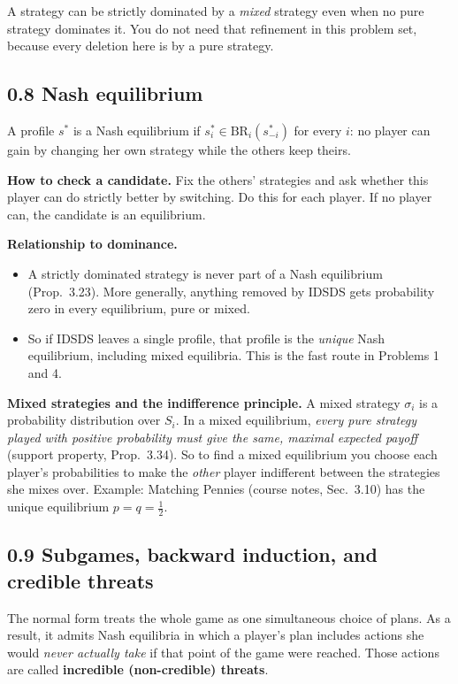 \documentclass[11pt]{article}
\newcommand{\BR}{\mathrm{BR}}
\begin{document}
A strategy can be strictly dominated by a \emph{mixed} strategy even when no pure strategy dominates it. You do not need that refinement in this problem set, because every deletion here is by a pure strategy.

\subsection*{0.8 Nash equilibrium}
\begin{keyidea}
A profile $s^*$ is a Nash equilibrium if $s_i^*\in\BR_i(s^*_{-i})$ for every $i$: no player can gain by changing her own strategy while the others keep theirs.
\end{keyidea}
\textbf{How to check a candidate.} Fix the others' strategies and ask whether this player can do strictly better by switching. Do this for each player. If no player can, the candidate is an equilibrium.

\textbf{Relationship to dominance.}
\begin{itemize}
\item A strictly dominated strategy is never part of a Nash equilibrium (Prop.~3.23). More generally, anything removed by IDSDS gets probability zero in every equilibrium, pure or mixed.
\item So if IDSDS leaves a single profile, that profile is the \emph{unique} Nash equilibrium, including mixed equilibria. This is the fast route in Problems 1 and 4.
\end{itemize}

\textbf{Mixed strategies and the indifference principle.} A mixed strategy $\sigma_i$ is a probability distribution over $S_i$. In a mixed equilibrium, \emph{every pure strategy played with positive probability must give the same, maximal expected payoff} (support property, Prop.~3.34). So to find a mixed equilibrium you choose each player's probabilities to make the \emph{other} player indifferent between the strategies she mixes over. Example: Matching Pennies (course notes, Sec.~3.10) has the unique equilibrium $p=q=\tfrac12$.

\subsection*{0.9 Subgames, backward induction, and credible threats}
The normal form treats the whole game as one simultaneous choice of plans. As a result, it admits Nash equilibria in which a player's plan includes actions she would \emph{never actually take} if that point of the game were reached. Those actions are called \textbf{incredible (non-credible) threats}.
\end{document}
